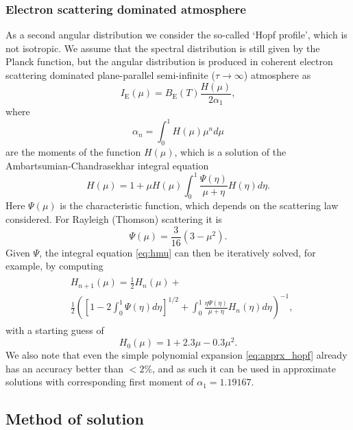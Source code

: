 \documentclass[iop, usenatbib]{emulateapj}
\begin{document}
\subsubsection{Electron scattering dominated atmosphere}

As a second angular distribution we consider the so-called `Hopf profile', which is not isotropic.
We assume that the spectral distribution is still given by the Planck function, but the angular distribution is produced in coherent electron scattering dominated plane-parallel semi-infinite ($\tau \rightarrow \infty$) atmosphere as
\begin{equation}
  I_{\mathrm{E}}(\mu) = B_{\mathrm{E}}(T) \frac{H(\mu)}{2\alpha_1},
\end{equation}
where
\begin{equation}
  \alpha_n = \int_0^1 H(\mu) \mu^n d\mu
\end{equation}
are the moments of the function $H(\mu)$, which is a solution of the Ambartsumian-Chandrasekhar integral equation \citep[see e.g.][]{Cha60,Sob63}
\begin{equation}\label{eq:hmu}
  H(\mu) = 1 + \mu H(\mu) \int_0^1 \frac{\Psi(\eta)}{\mu + \eta} H(\eta) d\eta.
\end{equation}
Here $\Psi(\mu)$ is the characteristic function, which depends on the scattering law considered.
For Rayleigh (Thomson) scattering it is
\begin{equation}
  \Psi(\mu) = \frac{3}{16}(3-\mu^2).
\end{equation}
Given $\Psi$, the integral equation \eqref{eq:hmu} can then be iteratively solved, for example, by computing
\begin{align}\begin{split}
&H_{n+1}(\mu) =  \frac{1}{2} H_n(\mu) + \\ &\frac{1}{2}\left( \left[1-2\int_0^1 \Psi(\eta)d\eta \right]^{1/2} + \int_0^1 \frac{\eta \Psi(\eta)}{\mu + \eta} H_n(\eta) d\eta \right)^{-1},
\end{split}\end{align}
with a starting guess of
\begin{equation}\label{eq:apprx_hopf}
  H_0(\mu) = 1 + 2.3\mu - 0.3\mu^2.
\end{equation}
We also note that even the simple polynomial expansion \eqref{eq:apprx_hopf} already has an accuracy better than $<2\%$, and as such it can be used in approximate solutions with corresponding first moment of $\alpha_1 = 1.19167$.


\subsection{Method of solution}
\end{document}
